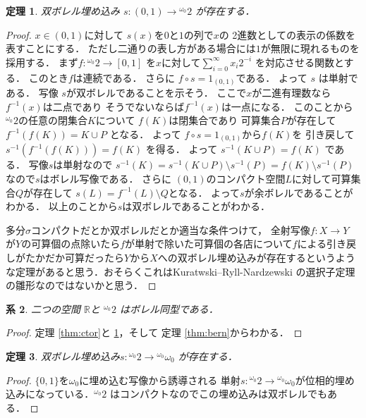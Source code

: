 \documentclass[leqno, 12pt]{jsarticle}
\newtheorem{thm}{定理}
\newtheorem{cor}[thm]{系}
\newcommand{\rr}{\mathbb{R}}
\newcommand{\myomega}{\omega_{0}}
\newcommand{\mycantor}{{}^{\myomega}2}
\newcommand{\mybaire}{{}^{\myomega}\myomega}
\begin{document}
\begin{thm}\label{thm:rtoc}
双ボレル埋め込み
$s\colon (0, 1)\to \mycantor$
が存在する．
\end{thm}
\begin{proof}
$x\in (0, 1)$に対して
$s(x)$を$0$と$1$の列で$x$の
2進数としての表示の係数を表すことにする．
ただし二通りの表し方がある場合には$1$が無限に現れるものを採用する．
まず$f\colon \mycantor\to [0, 1]$
を$x$に対して$\sum_{i=0}^{\infty}x_{i}2^{-i}$
を対応させる関数とする．
このとき$f$は連続である．
さらに
$f\circ s=1_{(0, 1)}$である．
よって
$s$
は単射である．
写像
$s$が双ボレルであることを示そう．
ここで$x$が二進有理数なら$f^{-1}(x)$は二点であり
そうでないならば$f^{-1}(x)$は一点になる．
このことから$\mycantor$の任意の閉集合$K$について
$f(K)$は閉集合であり
可算集合$P$が存在して
$f^{-1}(f(K))=K\cup P$
となる．
よって
$f\circ s=1_{(0, 1)}$から$f(K)$を
引き戻して
$s^{-1}(f^{-1}(f(K)))=f(K)$
を得る．
よって
$s^{-1}(K\cup P)=f(K)$
である．
写像$s$は単射なので
$s^{-1}(K)=s^{-1}(K\cup P)\setminus s^{-1}(P)
=f(K)\setminus s^{-1}(P)$
なので$s$はボレル写像である．
さらに
$(0, 1)$のコンパクト空間$L$に対して可算集合$Q$が存在して
$s(L)=f^{-1}(L)\setminus  Q$となる．
よって$s$が余ボレルであることがわかる．
以上のことから$s$は双ボレルであることがわかる．

多分$\sigma$コンパクトだとか双ボレルだとか適当な条件つけて，
全射写像$f\colon X\to Y$
が$Y$の可算個の点除いたら$f$が単射で除いた可算個の各店について$f$による引き戻しがたかだか可算だったら$Y$から$X$への双ボレル埋め込みが存在するというような定理があると思う．おそらくこれはKuratwski--Ryll-Nardzewski の選択子定理の雛形なのではないかと思う．
\end{proof}


\begin{cor}\label{cor:reqc}
二つの空間
$\rr$と
$\mycantor$
はボレル同型である．
\end{cor}
\begin{proof}
定理 \ref{thm:ctor}と
\ref{thm:rtoc}，そして
定理 \ref{thm:bern}からわかる．
\end{proof}

\begin{thm}\label{thm:ctob}
双ボレル埋め込み$s\colon \mycantor \to \mybaire$
が存在する．
\end{thm}
\begin{proof}
$\{0, 1\}$を$\myomega$に埋め込む写像から誘導される
単射$s\colon \mycantor \to \mybaire$が位相的埋め込みになっている．$\mycantor$
はコンパクトなのでこの埋め込みは双ボレルでもある．
\end{proof}
\end{document}
